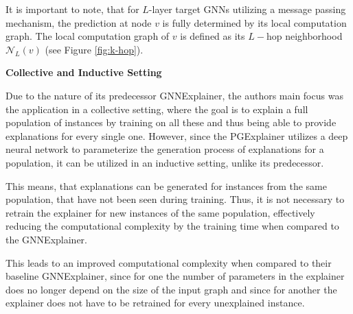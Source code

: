 It is important to note, that for $L$-layer target GNNs utilizing a message passing mechanism, the prediction at node $v$ is fully determined by its local computation graph. The local computation graph of $v$ is defined as its $L-$hop neighborhood $\mathcal{N}_L(v)$ \cite{ying2019gnnexplainer} (see Figure \ref{fig:k-hop}).\bigskip

\textbf{Collective and Inductive Setting}\par
Due to the nature of its predecessor GNNExplainer, the authors main focus was the application in a collective setting, where the goal is to explain a full population of instances by training on all these and thus being able to provide explanations for every single one. However, since the PGExplainer utilizes a deep neural network to parameterize the generation process of explanations for a population, it can be utilized in an inductive setting, unlike its predecessor. 

This means, that explanations can be generated for instances from the same population, that have not been seen during training. Thus, it is not necessary to retrain the explainer for new instances of the same population, effectively reducing the computational complexity by the training time when compared to the GNNExplainer.


This leads to an improved computational complexity when compared to their baseline GNNExplainer, since for one the number of parameters in the explainer does no longer depend on the size of the input graph and since for another the explainer does not have to be retrained for every unexplained instance.

